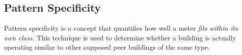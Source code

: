 \subsection{Pattern Specificity}
\label{sec:patternspec}

Pattern specificity is a concept that quantifies how well a meter \emph{fits within its own class}. This technique is used to determine whether a building is actually operating similar to other supposed peer buildings of the same type.